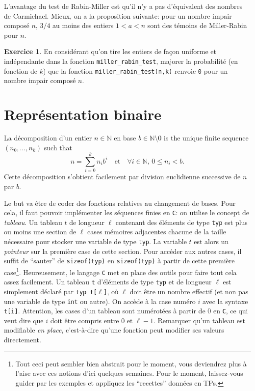 \documentclass[french,a4paper]{article}
\theoremstyle{definition}
\newtheorem{exercise}{Exercice}
\theoremstyle{remark}
\newcommand{\inlinec}[1]{\lstinline[style=C]°#1°}
\begin{document}
L'avantage du test de Rabin-Miller est qu'il n'y a pas d'équivalent
des nombres de Carmichael. Mieux, on a la proposition suivante: pour
un nombre impair composé $n$, $3/4$ au moins des entiers $1 < a < n$
sont des témoins de Miller-Rabin pour $n$.
\begin{exercise}
  En considérant qu'on tire les entiers de façon uniforme et
  indépendante dans la fonction \inlinec{miller_rabin_test}, majorer
  la probabilité (en fonction de $k$) que la fonction
  \inlinec{miller_rabin_test(n,k)} renvoie \inlinec{0} pour un nombre
  impair composé $n$.
\end{exercise}

\section{Représentation binaire}
\label{sec:binary}

La décomposition d'un entier $n\in \mathbb N$ en base
$b \in \mathbb N \setminus{0}$ is the unique finite sequence
$(n_0,\dots,n_k)$ such that
\begin{displaymath}
  n = \sum_{i=0}^k n_ib^i
  \quad\text{et}\quad
  \forall i \in \mathbb N,\, 0\leq n_i < b.
\end{displaymath}
Cette décomposition s'obtient facilement par division euclidienne
successive de $n$ par $b$.

\medskip

Le but va être de coder des fonctions relatives au changement de
bases. Pour cela, il faut pouvoir implémenter les séquences finies en
{\tt C}: on utilise le concept de {\em tableau}. Un tableau $t$ de
longueur $\ell$ contenant des éléments de type \inlinec{typ} est plus
ou moins une section de $\ell$ cases mémoires adjacentes chacune de la
taille nécessaire pour stocker une variable de type \inlinec{typ}. La
variable $t$ est alors un {\em pointeur} sur la première case de cette
section. Pour accéder aux autres cases, il suffit de ``sauter'' de
\inlinec{sizeof(typ)} en \inlinec{sizeof(typ)} à partir de cette
première case\footnote{Tout ceci peut sembler bien abstrait pour le
  moment, vous deviendrez plus à l'aise avec ces notions d'ici
  quelques semaines. Pour le moment, laissez-vous guider par les
  exemples et appliquez les ``recettes'' données en
  TPs.}. Heureusement, le langage {\tt C} met en place des outils pour
faire tout cela assez facilement. Un tableau \inlinec{t} d'éléments de
type \inlinec{typ} et de longueur $\ell$ est simplement déclaré par
\inlinec{typ t[}$\ell$\inlinec{]}, où $\ell$ doit être un nombre
effectif (et non pas une variable de type \inlinec{int} ou autre). On
accède à la case numéro $i$ avec la syntaxe \inlinec{t[i]}. Attention,
les cases d'un tableau sont numérotées à partir de $0$ en {\tt C}, ce
qui veut dire que $i$ doit être compris entre $0$ et
$\ell-1$. Remarquer qu'un tableau est modifiable {\em en place},
c'est-à-dire qu'une fonction peut modifier ses valeurs directement.
\end{document}

